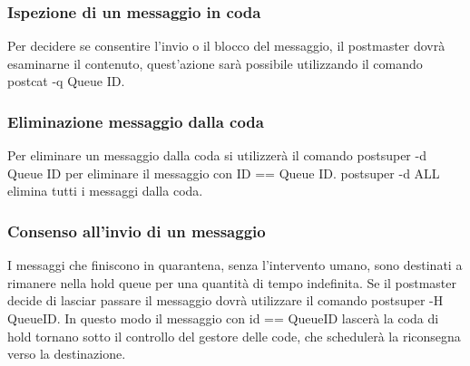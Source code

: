   \subsubsection{Ispezione di un messaggio in coda}
  Per decidere se consentire l'invio o il blocco del messaggio, il postmaster dovrà  esaminarne il contenuto, 
  quest'azione sarà possibile utilizzando il comando postcat -q Queue ID.
  
  
  \subsubsection{Eliminazione messaggio dalla coda}
  Per eliminare un messaggio dalla coda si utilizzerà il comando postsuper -d Queue ID per eliminare il messaggio con 
  ID == Queue ID.
  postsuper -d ALL elimina tutti i messaggi dalla coda.
  
  
  \subsubsection{Consenso all'invio di un messaggio}
  I messaggi che finiscono in quarantena, senza l'intervento umano, sono destinati a rimanere nella hold queue per una 
  quantità di tempo indefinita. Se il postmaster decide di lasciar passare il messaggio dovrà utilizzare il comando
  postsuper -H QueueID. In questo modo il messaggio con id == QueueID lascerà la coda di hold tornano sotto il controllo
  del gestore delle code, che schedulerà la riconsegna verso la destinazione.